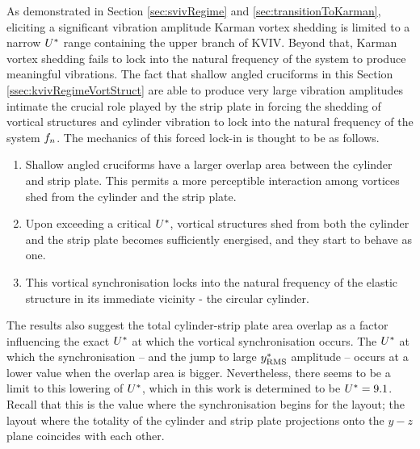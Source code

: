 \documentclass[oneside]{utmthesis}
\begin{document}
As demonstrated in Section \ref{sec:svivRegime} and \ref{sec:transitionToKarman}, eliciting a significant vibration amplitude Karman vortex shedding is limited to a narrow $U^{*}$ range containing the upper branch of KVIV. Beyond that, Karman vortex shedding fails to lock into the natural frequency of the system to produce meaningful vibrations. The fact that shallow angled cruciforms in this Section \ref{ssec:kvivRegimeVortStruct} are able to produce very large vibration amplitudes intimate the crucial role played by the strip plate in forcing the shedding of vortical structures and cylinder vibration to lock into the natural frequency of the system $f_{n}$. The mechanics of this forced lock-in is thought to be as follows.

\begin{enumerate}
  \item Shallow angled cruciforms have a larger overlap area between the cylinder and strip plate. This permits a more perceptible interaction among vortices shed from the cylinder and the strip plate.
  \item Upon exceeding a critical $U^{*}$, vortical structures shed from both the cylinder and the strip plate becomes sufficiently energised, and they start to behave as one.
  \item This vortical synchronisation locks into the natural frequency of the elastic structure in its immediate vicinity - the circular cylinder.
\end{enumerate}

\noindent The results also suggest the total cylinder-strip plate area overlap as a factor influencing the exact $U^{*}$ at which the vortical synchronisation occurs. The $U^{*}$ at which the synchronisation -- and the jump to large $y^{*}_{\text{RMS}}$ amplitude -- occurs at a lower value when the overlap area is bigger. Nevertheless, there seems to be a limit to this lowering of $U^{*}$, which in this work is determined to be $U^{*} = 9.1$. Recall that this is the value where the synchronisation begins for the \angon{} layout; the layout where the totality of the cylinder and strip plate projections onto the $y-z$ plane coincides with each other.
\end{document}
